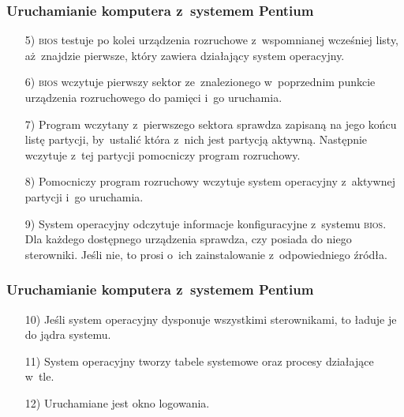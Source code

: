 \documentclass[10pt,t]{beamer}
\begin{document}
\begin{frame}
  \frametitle{Uruchamianie komputera z~systemem Pentium}


  \begin{itemize}

  \item[5)] \textsc{bios} testuje po kolei urządzenia rozruchowe
    z~wspomnianej wcześniej listy, aż~znajdzie pierwsze, który zawiera
    działający system operacyjny.

  \item[6)] \textsc{bios} wczytuje pierwszy sektor ze~znalezionego
    w~poprzednim punkcie urządzenia rozruchowego do pamięci i~go uruchamia.

  \item[7)] Program wczytany z~pierwszego sektora sprawdza zapisaną na jego
    końcu listę partycji, by~ustalić która z~nich jest partycją aktywną.
    Następnie wczytuje z~tej partycji pomocniczy program rozruchowy.

  \item[8)] Pomocniczy program rozruchowy wczytuje system operacyjny
    z~aktywnej partycji i~go uruchamia.

  \item[9)] System operacyjny odczytuje informacje konfiguracyjne z~systemu
    \textsc{bios}. Dla każdego dostępnego urządzenia sprawdza, czy posiada
    do niego sterowniki. Jeśli nie, to prosi o~ich zainstalowanie
    z~odpowiedniego źródła.

  \end{itemize}

\end{frame}





\begin{frame}
  \frametitle{Uruchamianie komputera z~systemem Pentium}


  \begin{itemize}

  \item[10)] Jeśli system operacyjny dysponuje wszystkimi sterownikami,
    to ładuje je do jądra systemu.

  \item[11)] System operacyjny tworzy tabele systemowe oraz procesy
    działające w~tle.

  \item[12)] Uruchamiane jest okno logowania.

  \end{itemize}

\end{frame}
\end{document}
